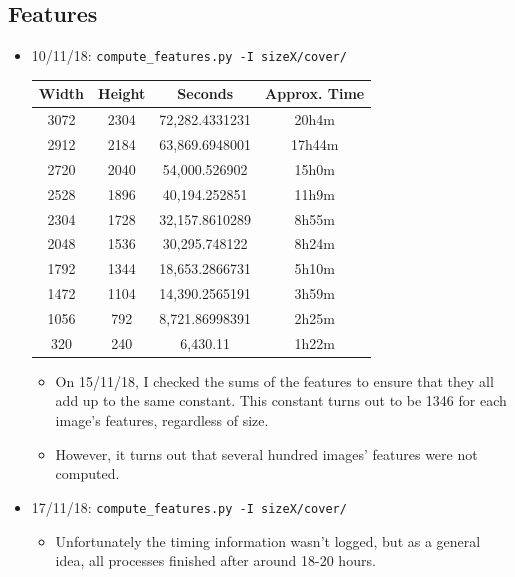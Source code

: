 \documentclass[11pt,a4paper]{report}
\begin{document}
\subsection{Features}
\begin{itemize}
\item 10/11/18: \texttt{compute\_features.py -I sizeX/cover/}
  \begin{center}
  \begin{tabular}{ c c | c c }
  Width & Height & Seconds & Approx. Time \\ \hline
  3072 & 2304 & 72,282.4331231 & 20h4m \\
  2912 & 2184 & 63,869.6948001 & 17h44m \\
  2720 & 2040 & 54,000.526902 & 15h0m \\
  2528 & 1896 & 40,194.252851 & 11h9m \\
  2304 & 1728 & 32,157.8610289 & 8h55m \\
  2048 & 1536 & 30,295.748122 & 8h24m \\
  1792 & 1344 & 18,653.2866731 & 5h10m \\
  1472 & 1104 & 14,390.2565191 & 3h59m \\
  1056 & 792 & 8,721.86998391 & 2h25m \\
  320 & 240 & 6,430.11 & 1h22m \\
  \end{tabular}
  \end{center}

  \begin{itemize}
  \item On 15/11/18, I checked the sums of the features to ensure that they all add up to the same constant. This constant turns out to be 1346 for each image's features, regardless of size.
  \item However, it turns out that several hundred images' features were not computed.
  \end{itemize}

\item 17/11/18: \texttt{compute\_features.py -I sizeX/cover/}
  \begin{itemize}
  \item Unfortunately the timing information wasn't logged, but as a general idea, all processes finished after around 18-20 hours.
  \end{itemize}
\end{itemize}
\end{document}
